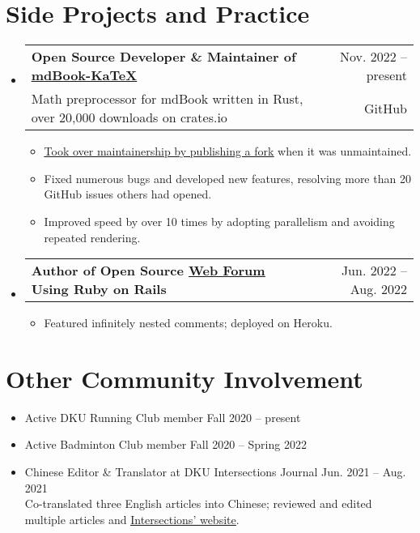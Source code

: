\documentclass[letterpaper,11pt]{article}
\makeatletter
\newcommand{\CVItem}[1]{
  \item{\small
    {#1 \vspace{-2pt}}
  }
}
\newcommand{\CVSubheadingFrame}[1]{
  \vspace{-2pt}\item
    \begin{tabular*}{0.97\textwidth}[t]{l@{\extracolsep{\fill}}r}
        #1
    \end{tabular*}\vspace{-7pt}
}
\newcommand{\CVSubheading}[4]{\CVSubheadingFrame
    {\textbf{#1} & #2 \\
        \small#3 & #4 \\
    }}
\newcommand{\CVSubHeadingListStart}{\begin{itemize}[leftmargin=0.5cm, label={}]}
\newcommand{\CVSubHeadingListEnd}{\end{itemize}}
\newcommand{\CVItemListStart}{\begin{itemize}}
\newcommand{\CVItemListEnd}{\end{itemize}\vspace{-5pt}}
\newcommand{\uhref}[2]{\href{#1}{\underline{#2}}}
\makeatother
\begin{document}
\section{Side Projects and Practice}
\CVSubHeadingListStart
\CVSubheading
{Open Source Developer \& Maintainer of
    \uhref{https://github.com/lzanini/mdbook-katex}{mdBook-KaTeX}
}{Nov. 2022 -- present}
{Math preprocessor for mdBook written in Rust,
    over 20,000 downloads on crates.io
}{GitHub}
\CVItemListStart
\CVItem
{\uhref{https://github.com/lzanini/mdbook-katex/issues/37}
    {Took over maintainership by publishing a fork} when
    it was unmaintained.
}
\CVItem
{Fixed numerous bugs and developed new features,
    resolving more than 20 GitHub issues others had opened.
}
\CVItem
{Improved speed by over 10 times by adopting parallelism and
    avoiding repeated rendering.
}
\CVItemListEnd

\CVSubheadingFrame
{\textbf{Author of Open Source \uhref{https://github.com/SichangHe/rails_forum}
        {Web Forum} Using Ruby on Rails}&
    Jun. 2022 -- Aug. 2022
}
\CVItemListStart
\CVItem
{Featured infinitely nested comments;
    deployed on Heroku.
}
\CVItemListEnd
\CVSubHeadingListEnd

\section{Other Community Involvement}
\begin{itemize}
    \item Active DKU Running Club member\hfill
          Fall 2020 -- present
          \vspace{-4pt}
    \item Active Badminton Club member\hfill
          Fall 2020 -- Spring 2022
          \vspace{-4pt}
    \item Chinese Editor \& Translator at DKU Intersections Journal\hfill
          Jun. 2021 -- Aug. 2021\\{\small
          Co-translated three English articles into Chinese;
          reviewed and edited multiple articles and
          \uhref{https://sites.duke.edu/intersections/}{Intersections' website}.
          }
          \vspace{-4pt}
\end{itemize}
\end{document}
